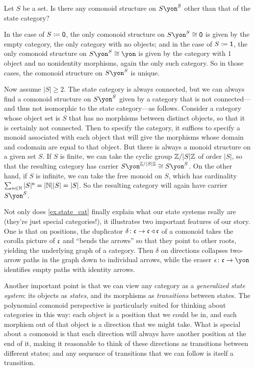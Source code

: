 \documentclass[Book-Poly]{subfiles}
\begin{document}
\begin{exercise} \label{exc.not_state_cat_but_same_carrier}
Let $S$ be a set. Is there any comonoid structure on $S\yon^S$ other than that of the state category?
\begin{solution}
In the case of $S\coloneqq\textsf{0}$, the only comonoid structure on $S\yon^S\iso\0$ is given by the empty category, the only category with no objects; and in the case of $S\coloneqq\textsf{1}$, the only comonoid structure on $S\yon^S\iso\yon$ is given by the category with $1$ object and no nonidentity morphisms, again the only such category.
So in those cases, the comonoid structure on $S\yon^S$ is unique.

Now assume $|S|\geq2$.
The state category is always connected, but we can always find a comonoid structure on $S\yon^S$ given by a category that is not connected---and thus not isomorphic to the state category---as follows.
Consider a category whose object set is $S$ that has no morphisms between distinct objects, so that it is certainly not connected.
Then to specify the category, it suffices to specify a monoid associated with each object that will give the morphisms whose domain and codomain are equal to that object.
But there is always a monoid structure on a given set $S$.
If $S$ is finite, we can take the cyclic group $\mathbb{Z}/|S|\mathbb{Z}$ of order $|S|$, so that the resulting category has carrier $S\yon^{\zz/|S|\zz}\iso S\yon^S$.
On the other hand, if $S$ is infinite, we can take the free monoid on $S$, which has cardinality $\sum_{n\in\mathbb{N}}|S|^{\mathsf{n}}=|\mathbb{N}||S|=|S|$.
So the resulting category will again have carrier $S\yon^S$.
\end{solution}
\end{exercise}

Not only does \cref{ex.state_cat} finally explain what our state systems really are (they're just special categories!), it illustrates two important features of our story.
One is that on positions, the duplicator $\delta\colon\mathfrak{c}\to\mathfrak{c}\mathbin{\triangleleft}\mathfrak{c}$ of a comonoid takes the corolla picture of $\mathfrak{c}$ and ``bends the arrows'' so that they point to other roots, yielding the underlying graph of a category.
Then $\delta$ on directions collapses two-arrow paths in the graph down to individual arrows, while the eraser $\epsilon\colon\car{c}\to\yon$ identifies empty paths with identity arrows.

Another important point is that we can view any category as a \emph{generalized state system}: its objects as \emph{states}, and its morphisms as \emph{transitions} between states.
The polynomial comonoid perspective is particularly suited for thinking about categories in this way: each object is a position that we could be in, and each morphism out of that object is a direction that we might take.
What is special about a comonoid is that each direction will always have another position at the end of it, making it reasonable to think of these directions as transitions between different states; and any sequence of transitions that we can follow is itself a transition.
\end{document}
